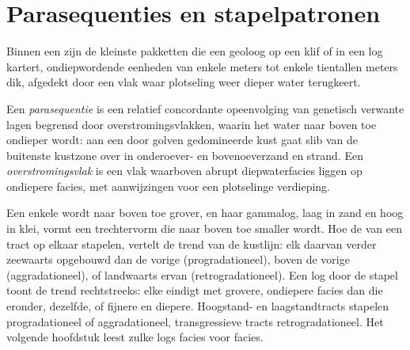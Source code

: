 \section{Parasequenties en stapelpatronen}\label{sec:b3:sequence-stratigraphy:parasequences}

Binnen een  zijn de kleinste pakketten die een geoloog op een klif of
in een log kartert, ondiepwordende eenheden van enkele meters tot enkele tientallen
meters dik, afgedekt door een vlak waar plotseling weer dieper water terugkeert.

\begin{definition}\label{def:b3:sequence-stratigraphy:parasequence}
Een \emph{parasequentie} is een relatief concordante
opeenvolging van genetisch verwante lagen begrensd door overstromingsvlakken, waarin
het water naar boven toe ondieper wordt: aan een door golven gedomineerde kust gaat slib van de
buitenste kustzone over in onderoever- en bovenoeverzand en strand. Een
\emph{overstromingsvlak} is een vlak waarboven abrupt diepwaterfacies liggen op ondiepere
facies, met aanwijzingen voor een plotselinge verdieping.
\end{definition}

Een enkele  wordt naar boven toe grover, en haar gammalog, laag in zand
en hoog in klei, vormt een trechtervorm die naar boven toe smaller wordt. Hoe de
 van een tract op elkaar stapelen, vertelt de trend van de
kustlijn: elk daarvan verder zeewaarts opgebouwd dan de vorige (progradationeel),
boven de vorige (aggradationeel), of landwaarts ervan (retrogradationeel). Een log
door de stapel toont de trend rechtstreeks: elke  eindigt met
grovere, ondiepere facies dan die eronder, dezelfde, of fijnere en diepere.
Hoogstand- en laagstandtracts stapelen progradationeel of aggradationeel,
transgressieve tracts retrogradationeel. Het volgende hoofdstuk leest zulke logs
facies voor facies.

